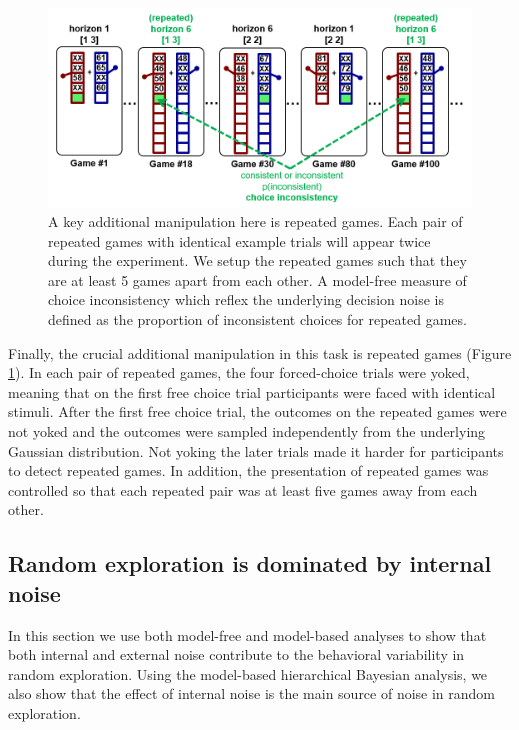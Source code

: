 \documentclass[12pt]{article}
\begin{document}
	\begin{figure}[H]
		\begin{center}
			\includegraphics[width=\textwidth]{figures/task.PNG}
			\caption{A key additional manipulation here is repeated games. Each pair of repeated games with identical example trials will appear twice during the experiment. We setup the repeated games such that they are at least 5 games apart from each other. A model-free measure of choice inconsistency which reflex the underlying decision noise is defined as the proportion of inconsistent choices for repeated games.}
			\label{fig:task2}
		\end{center}
	\end{figure}
	
	Finally, the crucial additional manipulation in this task is repeated games (Figure \ref{fig:task2}). In each pair of repeated games, the four forced-choice trials were yoked, meaning that on the first free choice trial participants were faced with identical stimuli.  After the first free choice trial, the outcomes on the repeated games were not yoked and the outcomes were sampled independently from the underlying Gaussian distribution.  Not yoking the later trials made it harder for participants to detect repeated games.  In addition, the presentation of repeated games was controlled so that each repeated pair was at least five games away from each other. 
	
	\subsection*{Random exploration is dominated by internal noise}
	
	In this section we use both model-free and model-based analyses to show that both internal and external noise contribute to the behavioral variability in random exploration. Using the model-based hierarchical Bayesian analysis, we also show that the effect of internal noise is the main source of noise in random exploration.
	
\end{document}
